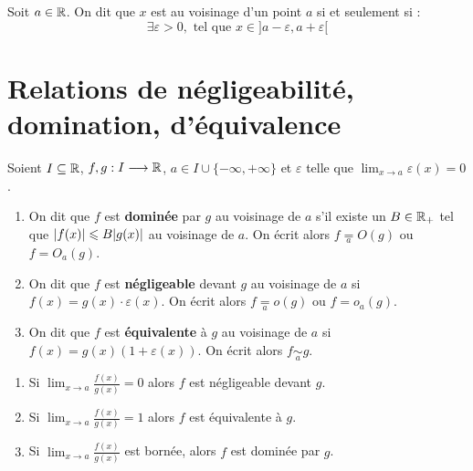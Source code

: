 \begin{definition} 
    Soit $a \in \mathbb{R}$.
    On dit que $x$ est au voisinage d'un point $a$ si et seulement si :
    \[ \exists \varepsilon > 0, \text{ tel que } x \in ]a - \varepsilon, a + \varepsilon[ \]
\end{definition}

\section{Relations de négligeabilité, domination, d'équivalence}
\begin{definition}
    Soient $I \subseteq \mathbb{R}$, $f, g : I \longrightarrow \mathbb{R}$, $a \in I \cup \{-\infty, +\infty\}$ et $\varepsilon$ telle que $\lim_{x \to a} \varepsilon(x) = 0$.
    \begin{enumerate}
        \item On dit que $f$ est \textbf{dominée} par $g$ au voisinage de $a$ s'il existe un $B \in \mathbb{R}_+$ tel que $\abs{f(x)} \leqslant B \abs{g(x)}$ au voisinage de $a$. 
        On écrit alors $f \underset{a}{=} O(g)$ ou $f = O_a(g)$.
        \item On dit que $f$ est \textbf{négligeable} devant $g$ au voisinage de $a$ si $f(x) = g(x) \cdot \varepsilon(x)$.
        On écrit alors $f \underset{a}{=} o(g)$ ou $f = o_a(g)$.
        \item On dit que $f$ est \textbf{équivalente} à $g$ au voisinage de $a$ si $f(x) = g(x) (1 + \varepsilon(x))$.
        On écrit alors $f \underset{a}{\sim} g$.
    \end{enumerate}
\end{definition}

\begin{proposition}
    \begin{enumerate}
        \item Si $\lim_{x \to a} \frac{f(x)}{g(x)} = 0$ alors $f$ est négligeable devant $g$.
        \item Si $\lim_{x \to a} \frac{f(x)}{g(x)} = 1$ alors $f$ est équivalente à $g$.
        \item Si $\lim_{x \to a} \frac{f(x)}{g(x)}$ est bornée, alors $f$ est dominée par $g$.
    \end{enumerate}   
\end{proposition}

